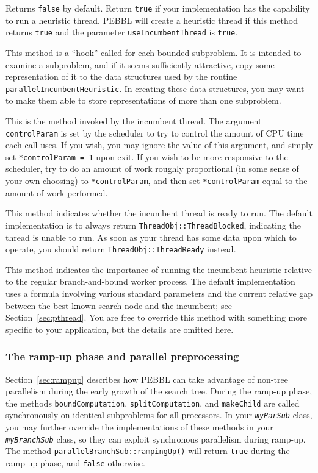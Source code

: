 Returns \texttt{false} by default.  Return \texttt{true} if your
implementation has the capability to run a heuristic thread.  PEBBL
will create a heuristic thread if this method returns \texttt{true} and
the parameter \texttt{useIncumbentThread} is \texttt{true}.

This method is a ``hook'' called for each bounded subproblem.  It is
intended to examine a subproblem, and if it seems
sufficiently attractive, copy some representation of it to the data
structures used by the routine \texttt{parallelIncumbentHeuristic}.
In creating these data structures, you may want to make them able to
store representations of more than one subproblem.

This is the method invoked by the incumbent thread.  The argument
\texttt{controlParam} is set by the scheduler to try to control the
amount of CPU time each call uses.  If you wish, you may ignore the
value of this argument, and simply set \texttt{*controlParam = 1} upon
exit. If you wish to be more responsive to the scheduler, try to do an
amount of work roughly proportional (in some sense of your own
choosing) to \texttt{*controlParam}, and then set
\texttt{*controlParam} equal to the amount of work performed.  

This method indicates
whether the incumbent thread is ready to run.  The default
implementation is to always return \texttt{ThreadObj::ThreadBlocked},
indicating the thread is unable to run.  As soon as your thread has
some data upon which to operate, you should return
\texttt{ThreadObj::ThreadReady} instead.  

This method indicates the importance of running the incumbent
heuristic relative to the regular branch-and-bound worker process. The
default implementation uses a formula involving various standard parameters and
the current relative gap between the best known search node and the
incumbent; see Section~\ref{sec:pthread}.  You are free to override
this method with something more specific to your application, but the
details are omitted here.


\subsubsection{The ramp-up phase and parallel preprocessing}
\label{sec:rampupdetails}
Section~\ref{sec:rampup} describes how PEBBL can take advantage of
non-tree parallelism during the early growth of the search tree.
During the ramp-up phase, the methods \texttt{boundComputation},
\texttt{splitComputation}, and \texttt{makeChild} are called
synchronously on identical subproblems for all processors.  In your
\texttt{\emph{myParSub}} class, you may further override the
implementations of these methods in your \texttt{\emph{myBranchSub}}
class, so they can exploit synchronous parallelism during ramp-up.
The method \texttt{parallelBranchSub::rampingUp()} will return
\texttt{true} during the ramp-up phase, and \texttt{false} otherwise.

